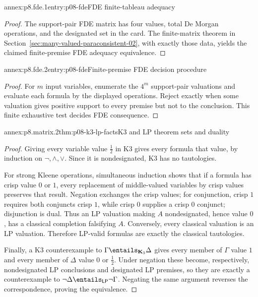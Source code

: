 \begin{annexitem}{annex:p8.fde.1}{entry:p08-fde}{FDE finite-tableau adequacy}
\begin{proof}
The support-pair FDE matrix has four values, total De Morgan operations, and the
designated set in the card.  The finite-matrix theorem in Section~\ref{sec:many-valued-paraconsistent-02}, with
exactly those data, yields the claimed finite-premise FDE adequacy equivalence.
\end{proof}
\end{annexitem}

\begin{annexitem}{annex:p8.fde.2}{entry:p08-fde}{Finite-premise FDE decision procedure}
\begin{proof}
For \(m\) input variables, enumerate the \(4^m\) support-pair valuations and
evaluate each formula by the displayed operations.  Reject exactly when some
valuation gives positive support to every premise but not to the conclusion.
This finite exhaustive test decides FDE consequence.
\end{proof}
\end{annexitem}

\begin{annexitem}{annex:p8.matrix.2}{thm:p08-k3-lp-facts}{K3 and LP theorem sets and duality}
\begin{proof}
Giving every variable value \(\tfrac12\) in K3 gives every formula that value,
by induction on \(\neg,\land,\lor\).  Since it is nondesignated, K3 has no
tautologies.

For strong Kleene operations, simultaneous induction shows that if a formula
has crisp value \(0\) or \(1\), every replacement of middle-valued variables
by crisp values preserves that result.  Negation exchanges the crisp values;
for conjunction, crisp \(1\) requires both conjuncts crisp \(1\), while crisp
\(0\) supplies a crisp \(0\) conjunct; disjunction is dual.  Thus an LP
valuation making \(A\) nondesignated, hence value \(0\), has a classical
completion falsifying \(A\).  Conversely, every classical valuation is an LP
valuation.  Therefore LP-valid formulas are exactly the classical tautologies.

Finally, a K3 counterexample to
\(\Gamma\entails_{\mathbf K_3}\Delta\) gives every member of \(\Gamma\) value \(1\) and
every member of \(\Delta\) value \(0\) or \(\tfrac12\).  Under negation these
become, respectively, nondesignated LP conclusions and designated LP premises,
so they are exactly a counterexample to
\(\neg\Delta\entails_{\mathsf{LP}}\neg\Gamma\).  Negating the same argument
reverses the correspondence, proving the equivalence.
\end{proof}
\end{annexitem}
